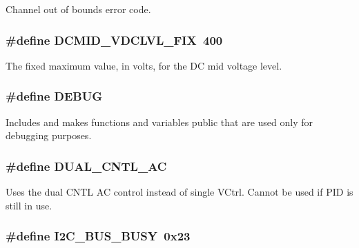 Channel out of bounds error code. \hypertarget{a00043_ad873d002fba2a43978755cfb5e9ad5ee}{
\subsubsection[{D\-C\-M\-I\-D\-\_\-\-V\-D\-C\-L\-V\-L\-\_\-\-F\-I\-X}]{\setlength{\rightskip}{0pt plus 5cm}\#define D\-C\-M\-I\-D\-\_\-\-V\-D\-C\-L\-V\-L\-\_\-\-F\-I\-X~400}}\label{a00043_ad873d002fba2a43978755cfb5e9ad5ee}
The fixed maximum value, in volts, for the D\-C mid voltage level. \hypertarget{a00043_ad72dbcf6d0153db1b8d8a58001feed83}{
\subsubsection[{D\-E\-B\-U\-G}]{\setlength{\rightskip}{0pt plus 5cm}\#define D\-E\-B\-U\-G}}\label{a00043_ad72dbcf6d0153db1b8d8a58001feed83}
Includes and makes functions and variables public that are used only for debugging purposes. \hypertarget{a00043_a600b96e7a1d3cd28e228833bb61f8074}{
\subsubsection[{D\-U\-A\-L\-\_\-\-C\-N\-T\-L\-\_\-\-A\-C}]{\setlength{\rightskip}{0pt plus 5cm}\#define D\-U\-A\-L\-\_\-\-C\-N\-T\-L\-\_\-\-A\-C}}\label{a00043_a600b96e7a1d3cd28e228833bb61f8074}
Uses the dual C\-N\-T\-L A\-C control instead of single V\-Ctrl. Cannot be used if P\-I\-D is still in use. \hypertarget{a00043_ad3082827214b064d5b8289acaeb9ad20}{
\subsubsection[{I2\-C\-\_\-\-B\-U\-S\-\_\-\-B\-U\-S\-Y}]{\setlength{\rightskip}{0pt plus 5cm}\#define I2\-C\-\_\-\-B\-U\-S\-\_\-\-B\-U\-S\-Y~0x23}}\label{a00043_ad3082827214b064d5b8289acaeb9ad20}
